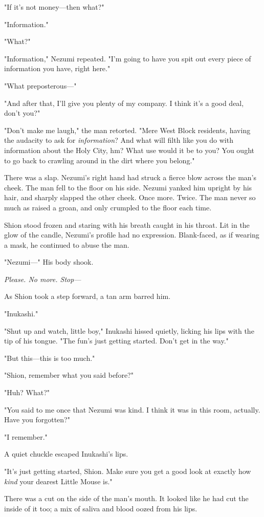 "If it's not money---then what?"

"Information."

"What?"

"Information," Nezumi repeated. "I'm going to have you spit out every
piece of information you have, right here."

"What preposterous---"

"And after that, I'll give you plenty of my company. I think it's a good
deal, don't you?"

"Don't make me laugh," the man retorted. "Mere West Block residents,
having the audacity to ask for \emph{information}? And what will filth like you
do with information about the Holy City, hm? What use would it be to
you? You ought to go back to crawling around in the dirt where you
belong."

There was a slap. Nezumi's right hand had struck a fierce blow across
the man's cheek. The man fell to the floor on his side. Nezumi yanked
him upright by his hair, and sharply slapped the other cheek. Once more.
Twice. The man never so much as raised a groan, and only crumpled to the
floor each time.

Shion stood frozen and staring with his breath caught in his throat. Lit
in the glow of the candle, Nezumi's profile had no expression.
Blank-faced, as if wearing a mask, he continued to abuse the man.

"Nezumi---" His body shook.

\emph{Please. No more. Stop---}

As Shion took a step forward, a tan arm barred him.

"Inukashi."

"Shut up and watch, little boy," Inukashi hissed quietly, licking his
lips with the tip of his tongue. "The fun's just getting started. Don't
get in the way."

"But this---this is too much."

"Shion, remember what you said before?"

"Huh? What?"

"You said to me once that Nezumi was kind. I think it was in this room,
actually. Have you forgotten?"

"I remember."

A quiet chuckle escaped Inukashi's lips.

"It's just getting started, Shion. Make sure you get a good look at
exactly how \emph{kind} your dearest Little Mouse is."

There was a cut on the side of the man's mouth. It looked like he had
cut the inside of it too; a mix of saliva and blood oozed from his lips.


